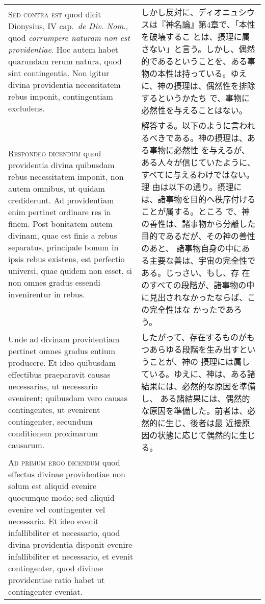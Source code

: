 \documentclass[10pt]{jsarticle} %
\begin{document}
\begin{longtable}{p{21em}p{21em}}
{\scshape Sed contra est} quod dicit Dionysius, IV
cap.~{\itshape de Div. Nom}., quod {\itshape corrumpere naturam non est providentiae}. Hoc
autem habet quarundam rerum natura, quod sint contingentia. Non igitur
divina providentia necessitatem rebus imponit, contingentiam excludens.

&


しかし反対に、ディオニュシウスは『神名論』第4章で、「本性を破壊するこ
とは、摂理に属さない」と言う。しかし、偶然的であるということを、ある事
物の本性は持っている。ゆえに、神の摂理は、偶然性を排除するというかたち
で、事物に必然性を与えることはない。


\\


{\scshape Respondeo dicendum} quod providentia divina
quibusdam rebus necessitatem imponit, non autem omnibus, ut quidam
crediderunt. Ad providentiam enim pertinet ordinare res in finem. Post
bonitatem autem divinam, quae est finis a rebus separatus, principale
bonum in ipsis rebus existens, est perfectio universi, quae quidem non
esset, si non omnes gradus essendi invenirentur in rebus. 


&

解答する。以下のように言われるべきである。神の摂理は、ある事物に必然性
を与えるが、ある人々が信じていたように、すべてに与えるわけではない。理
由は以下の通り。摂理には、諸事物を目的へ秩序付けることが属する。ところ
で、神の善性は、諸事物から分離した目的であるだが、その神の善性のあと、
諸事物自身の中にある主要な善は、宇宙の完全性である。じっさい、もし、存
在のすべての段階が、諸事物の中に見出されなかったならば、この完全性はな
かったであろう。


\\

Unde ad
divinam providentiam pertinet omnes gradus entium producere. Et ideo
quibusdam effectibus praeparavit causas necessarias, ut necessario
evenirent; quibusdam vero causas contingentes, ut evenirent
contingenter, secundum conditionem proximarum causarum.

&

したがって、存在するものがもつあらゆる段階を生み出すということが、神の
摂理には属している。ゆえに、神は、ある諸結果には、必然的な原因を準備し、
ある諸結果には、偶然的な原因を準備した。前者は、必然的に生じ、後者は最
近接原因の状態に応じて偶然的に生じる。


\\


{\scshape Ad primum ergo dicendum} quod effectus divinae
providentiae non solum est aliquid evenire quocumque modo; sed aliquid
evenire vel contingenter vel necessario. Et ideo evenit infallibiliter
et necessario, quod divina providentia disponit evenire infallibiliter
et necessario, et evenit contingenter, quod divinae providentiae ratio
habet ut contingenter eveniat.


\end{longtable}
\end{document}
